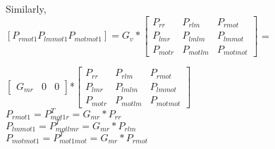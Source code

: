 \documentclass[11pt,a4paper]{article}
\begin{document}
\noindent Similarly,\\
\noindent $[P_{rmot1}  P_{lmmot1}  P_{motmot1}] = G_{v}*\begin{bmatrix} P_{rr} & P_{rlm} & P_{rmot}\\
										   P_{lmr}& P_{lmlm}  & P_{lmmot}\\
										   P_{motr}& P_{motlm}  & P_{motmot}\end{bmatrix}$ =
										   
										    $  \begin{bmatrix} G_{mr} & 0 & 0 \end{bmatrix}$*$\begin{bmatrix} P_{rr} & P_{rlm} & P_{rmot}\\
										   P_{lmr}& P_{lmlm}  & P_{lmmot}\\
										   P_{motr}& P_{motlm}  & P_{motmot}\end{bmatrix}$\\										   
$P_{rmot1} = P_{mot1r}^{T} = G_{mr}*P_{rr} $  \\
$P_{lmmot1} = P_{motlmr}^{T} = G_{mr}*P_{rlm} $  \\
$P_{motmot1} = P_{mot1mot}^{T} = G_{mr}*P_{rmot} $  \\ 
\end{document}
